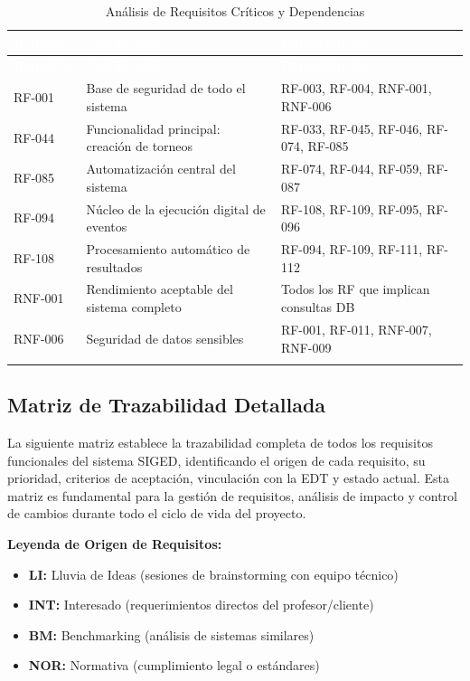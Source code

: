 \documentclass[12pt,a4paper]{article}
\begin{document}
\begin{longtable}{|>{\centering\arraybackslash}p{2cm}|>{\raggedright\arraybackslash}p{4.5cm}|>{\raggedright\arraybackslash}p{7.5cm}|}
\hline
\rowcolor{headercolor}
\textcolor{white}{\textbf{Requisito}} & \textcolor{white}{\textbf{Justificación}} & \textcolor{white}{\textbf{Dependencias}} \\
\hline
\endfirsthead
\hline
\rowcolor{headercolor}
\textcolor{white}{\textbf{Requisito}} & \textcolor{white}{\textbf{Justificación}} & \textcolor{white}{\textbf{Dependencias}} \\
\hline
\endhead
\hline
\endlastfoot

RF-001 & Base de seguridad de todo el sistema & RF-003, RF-004, RNF-001, RNF-006 \\
\hline
\rowcolor{rowgray}
RF-044 & Funcionalidad principal: creación de torneos & RF-033, RF-045, RF-046, RF-074, RF-085 \\
\hline
RF-085 & Automatización central del sistema & RF-074, RF-044, RF-059, RF-087 \\
\hline
\rowcolor{rowgray}
RF-094 & Núcleo de la ejecución digital de eventos & RF-108, RF-109, RF-095, RF-096 \\
\hline
RF-108 & Procesamiento automático de resultados & RF-094, RF-109, RF-111, RF-112 \\
\hline
\rowcolor{rowgray}
RNF-001 & Rendimiento aceptable del sistema completo & Todos los RF que implican consultas DB \\
\hline
RNF-006 & Seguridad de datos sensibles & RF-001, RF-011, RNF-007, RNF-009 \\
\hline
\caption{Análisis de Requisitos Críticos y Dependencias}
\end{longtable}

\newpage

\subsection{Matriz de Trazabilidad Detallada}

La siguiente matriz establece la trazabilidad completa de todos los requisitos funcionales del sistema SIGED, identificando el origen de cada requisito, su prioridad, criterios de aceptación, vinculación con la EDT y estado actual. Esta matriz es fundamental para la gestión de requisitos, análisis de impacto y control de cambios durante todo el ciclo de vida del proyecto.

\textbf{Leyenda de Origen de Requisitos:}
\begin{itemize}[noitemsep]
    \item \textbf{LI:} Lluvia de Ideas (sesiones de brainstorming con equipo técnico)
    \item \textbf{INT:} Interesado (requerimientos directos del profesor/cliente)
    \item \textbf{BM:} Benchmarking (análisis de sistemas similares)
    \item \textbf{NOR:} Normativa (cumplimiento legal o estándares)
\end{itemize}
\end{document}
